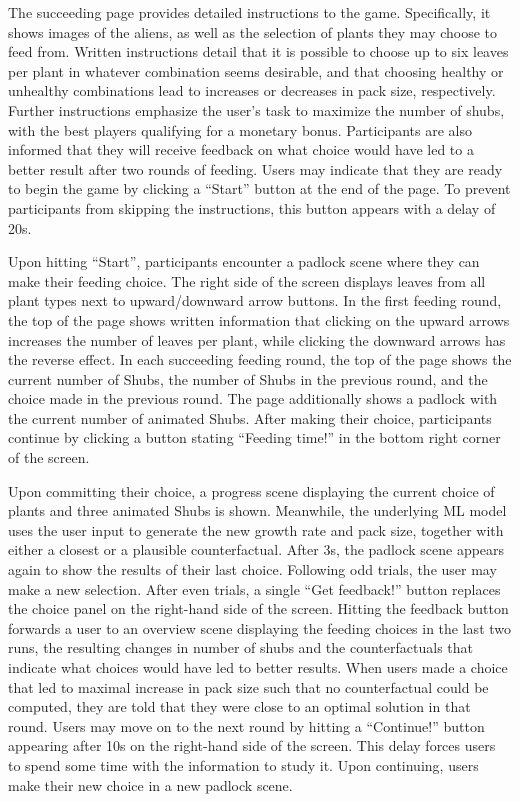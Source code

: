 The succeeding page provides detailed instructions to the game. 
Specifically, it shows images of the aliens, as well as the selection of plants they may choose to feed from.
Written instructions detail that it is possible to choose up to six leaves per plant in whatever combination seems desirable, and that choosing healthy or unhealthy combinations lead to increases or decreases in pack size, respectively.
Further instructions emphasize the user's task to maximize the number of shubs, with the best players qualifying for a monetary bonus.
Participants are also informed that they will receive feedback on what choice would have led to a better result after two rounds of feeding.
Users may indicate that they are ready to begin the game by clicking a ``Start'' button at the end of the page.
To prevent participants from skipping the instructions, this button appears with a delay of 20s.

Upon hitting ``Start'', participants encounter a padlock scene where they can make their feeding choice.
The right side of the screen displays leaves from all plant types next to upward/downward arrow buttons. 
In the first feeding round, the top of the page shows written information that clicking on the upward arrows increases the number of leaves per plant, while clicking the downward arrows has the reverse effect.
In each succeeding feeding round, the top of the page shows the current number of Shubs, the number of Shubs in the previous round, and the choice made in the previous round.
The page additionally shows a padlock with the current number of animated Shubs.
After making their choice, participants continue by clicking a button stating ``Feeding time!'' in the bottom right corner of the screen.

Upon committing their choice, a progress scene displaying the current choice of plants and three animated Shubs is shown. 
Meanwhile, the underlying \gls{ML} model uses the user input to generate the new growth rate and pack size, together with either a closest or a plausible counterfactual.
After 3s, the padlock scene appears again to show the results of their last choice. 
Following odd trials, the user may make a new selection. 
After even trials, a single ``Get feedback!'' button replaces the choice panel on the right-hand side of the screen.
Hitting the feedback button forwards a user to an overview scene displaying the feeding choices in the last two runs, the resulting changes in number of shubs and the counterfactuals that indicate what choices would have led to better results. 
When users made a choice that led to maximal increase in pack size such that no counterfactual could be computed, they are told that they were close to an optimal solution in that round. 
Users may move on to the next round by hitting a ``Continue!'' button appearing after 10s on the right-hand side of the screen. This delay forces users to spend some time with the information to study it. Upon continuing, users make their new choice in a new padlock scene.

